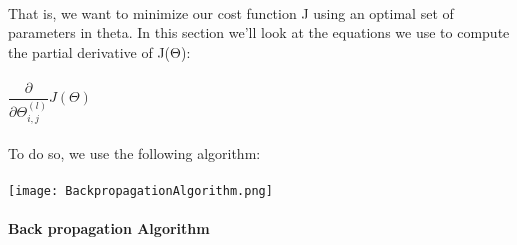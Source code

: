 \documentclass[UTF8]{ctexart}
\begin{document}
\paragraph{}
That is, we want to minimize our cost function J using an optimal set of parameters in theta. In this section we'll look at the equations we use to compute the partial derivative of J(Θ):
\paragraph{}
$\dfrac{\partial}{\partial \Theta_{i,j}^{(l)}} J(\Theta)$
\paragraph{}
To do so, we use the following algorithm:
\paragraph{}
\texttt{[image: BackpropagationAlgorithm.png]}
\paragraph{}
\textbf{Back propagation Algorithm}
\end{document}
